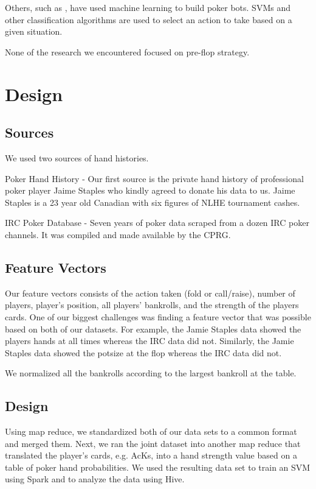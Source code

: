\documentclass[twoside]{article}
\begin{document}
\begin{multicols}{2}
Others, such as \cite{holdemml}, have used machine learning to build poker bots. SVMs and other classification algorithms are used to select an action to take based on a given situation.

None of the research we encountered focused on pre-flop strategy. 


\section{Design}


\subsection{Sources}
We used two sources of hand histories.
\begin{compactitem}
\item{Poker Hand History} - Our first source is the private hand history of professional poker player Jaime Staples who kindly agreed to donate his data to us. Jaime Staples is a 23 year old Canadian with six figures of NLHE tournament cashes.
\item{IRC Poker Database} - Seven years of poker data scraped from a dozen IRC poker channels. It was compiled and made available by the CPRG.
\end{compactitem}

\subsection{Feature Vectors}
Our feature vectors consists of the action taken (fold or call/raise), number of players, player's position, all players' bankrolls, and the strength of the players cards. One of our biggest challenges was finding a feature vector that was possible based on both of our datasets. For example, the Jamie Staples data showed the players hands at all times whereas the IRC data did not. Similarly, the Jamie Staples data showed the potsize at the flop whereas the IRC data did not.  

We normalized all the bankrolls according to the largest bankroll at the table. 

\subsection{Design}
Using map reduce, we standardized both of our data sets to a common format and merged them. Next, we ran the joint dataset into another map reduce that translated the player's cards, e.g. AcKs, into a hand strength value based on a table of poker hand probabilities. We used the resulting data set to train an SVM using Spark and to analyze the data using Hive. 


\end{multicols}
\end{document}
